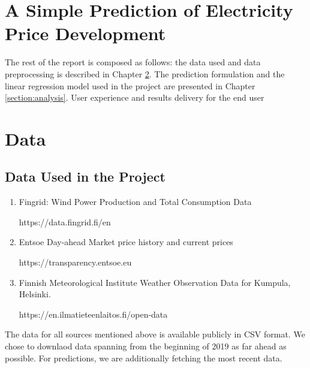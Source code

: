 \documentclass{article}
\begin{document}


\tableofcontents

\section{A Simple Prediction of Electricity Price Development}
\label{section:introduction}


The rest of the report is composed as follows: the data used and data preprocessing is described in Chapter \ref{section:data}. The prediction formulation and the linear regression model used in the project are presented in Chapter \ref{section:analysis}. User experience and results delivery for the end user 

\section{Data}
\label{section:data}

\subsection{Data Used in the Project}
\label{subsection:datadescription}

\begin{enumerate}
    \item Fingrid: Wind Power Production and Total Consumption Data
    
    https://data.fingrid.fi/en
        
    \item Entsoe Day-ahead Market price history and current prices
    
    https://transparency.entsoe.eu
    
    \item Finnish Meteorological Institute Weather Observation Data for Kumpula, Helsinki.
    
    https://en.ilmatieteenlaitos.fi/open-data
    
\end{enumerate}

The data for all sources mentioned above is available publicly in CSV format.
We chose to downlaod data spanning from the beginning of 2019 as far ahead as possible.
For predictions, we are additionally fetching the most recent data.
\end{document}
